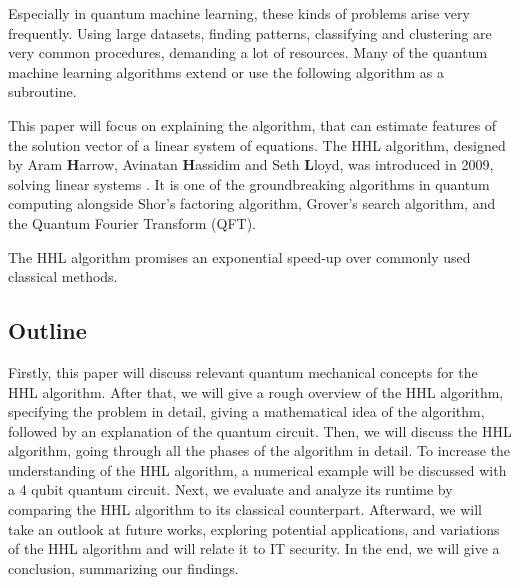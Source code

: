 Especially in quantum machine learning, these kinds of problems arise very frequently. 
Using large datasets, finding patterns, classifying and clustering are very common procedures, demanding a lot of resources. 
Many of the quantum machine learning algorithms extend or use the following algorithm as a subroutine. 

This paper will focus on explaining the algorithm, that can estimate features of the solution vector of a linear system of equations.
The HHL algorithm, designed by Aram \textbf{H}arrow, Avinatan \textbf{H}assidim and Seth \textbf{L}loyd, was introduced in 2009, solving linear systems \cite{hhl}.
It is one of the groundbreaking algorithms in quantum computing alongside Shor's factoring algorithm, Grover's search algorithm, and the Quantum Fourier Transform (QFT).


The HHL algorithm promises an exponential speed-up over commonly used classical methods.

\subsection{Outline}
Firstly, this paper will discuss relevant quantum mechanical concepts for the HHL algorithm.
After that, we will give a rough overview of the HHL algorithm, specifying the problem in detail, giving a mathematical idea of the algorithm, followed by an explanation of the quantum circuit.
Then, we will discuss the HHL algorithm, going through all the phases of the algorithm in detail. 
To increase the understanding of the HHL algorithm, a numerical example will be discussed with a 4 qubit quantum circuit.
Next, we evaluate and analyze its runtime by comparing the HHL algorithm to its classical counterpart. 
Afterward, we will take an outlook at future works, exploring potential applications, and variations of the HHL algorithm and will relate it to IT security. 
In the end, we will give a conclusion, summarizing our findings. 


